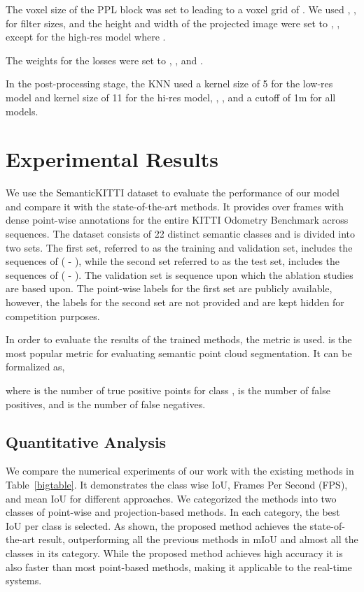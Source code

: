 \documentclass{article}
\begin{document}
The voxel size of the PPL block was set to  leading to a voxel grid of .
We used ,  ,  for filter sizes, and the height and width of the projected image were set to  , , except for the high-res model where .

The weights for the losses were set to , , and .

In the post-processing stage, the KNN used a kernel size of 5 for the low-res model and kernel size of 11 for the hi-res model, , , and a cutoff of 1m for all models.


\section{Experimental Results}
\label{sec:result}

We use the SemanticKITTI dataset  \cite{DBLP:conf/iccv/BehleyGMQBSG19}  to evaluate the performance of our model and compare it with the state-of-the-art methods. It provides over  frames with dense point-wise annotations for the entire KITTI Odometry Benchmark across  sequences. The dataset consists of 22 distinct semantic classes and is divided into two sets. The first set, referred to as the training and validation set, includes the sequences of ( - ), while the second set referred to as the test set, includes the sequences of ( - ). The validation set is sequence  upon which the ablation studies are based upon. The point-wise labels for the first set are publicly available, however, the labels for the second set are not provided and are kept hidden for competition purposes.


In order to evaluate the results of the trained methods, the  metric is used.   is the most popular metric for evaluating semantic point cloud segmentation. It can be formalized as, 

         

where  is the number of true positive points for class ,  is the number of false positives, and  is the number of false negatives.


\subsection{Quantitative Analysis}

We compare the numerical experiments of our work with the existing methods in Table~\ref{bigtable}. It demonstrates the class wise IoU, Frames Per Second (FPS), and mean IoU for different approaches. We categorized the methods into two classes of point-wise and projection-based methods. In each category, the best IoU per class is selected. As shown, the proposed method achieves the state-of-the-art result, outperforming all the previous methods in mIoU and almost all the classes in its category. While the proposed method achieves high accuracy it is also faster than most point-based methods, making it applicable to the real-time systems.
\end{document}

